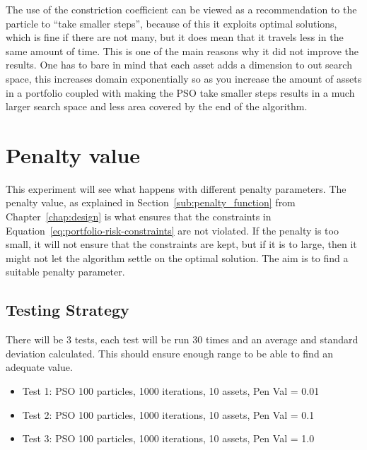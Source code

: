 \documentclass{pdfmx4020}
\begin{document}
      The use of the constriction coefficient can be viewed as a recommendation to the particle to ``take smaller steps''\cite{constriction_factor_4}, because of this it exploits optimal solutions, which is fine if there are not many, but it does mean that it travels less in the same amount of time. This is one of the main reasons why it did not improve the results. One has to bare in mind that each asset adds a dimension to out search space, this increases domain exponentially so as you increase the amount of assets in a portfolio coupled with making the PSO take smaller steps results in a much larger search space and less area covered by the end of the algorithm. 
       



  \section{Penalty value} %
  \label{sec:penalty_value}
  This experiment will see what happens with different penalty parameters. The penalty value, as explained in Section~\ref{sub:penalty_function} from Chapter~\ref{chap:design} is what ensures that the constraints in Equation~\ref{eq:portfolio-risk-constraints} are not violated. If the penalty is too small, it will not ensure that the constraints are kept, but if it is to large, then it might not let the algorithm settle on the optimal solution. The aim is to find a suitable penalty parameter. 

    \subsection{Testing Strategy}
      There will be 3 tests, each test will be run 30 times and an average and standard deviation calculated. This should ensure enough range to be able to find an adequate value.
      \begin{itemize}
        \item Test 1: PSO 100 particles, 1000 iterations, 10 assets, Pen Val = 0.01
        \item Test 2: PSO 100 particles, 1000 iterations, 10 assets, Pen Val = 0.1
        \item Test 3: PSO 100 particles, 1000 iterations, 10 assets, Pen Val = 1.0
      \end{itemize}
\end{document}
